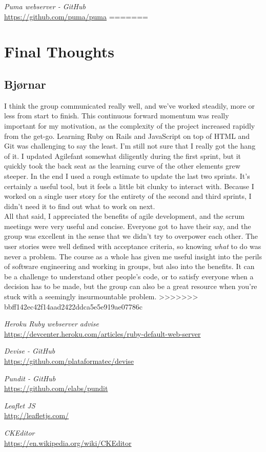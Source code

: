 \documentclass[a4paper]{article}
\begin{document}
\begin{thebibliography}{9}
\emph{Puma webserver - GitHub}\\
\url{https://github.com/puma/puma}
=======
\section{Final Thoughts}

\subsection{Bjørnar}
I think the group communicated really well, and we've worked steadily, more or less from start to finish. This continuous forward momentum was really important for my motivation, as the complexity of the project increased rapidly from the get-go. Learning Ruby on Rails and JavaScript on top of HTML and Git was challenging to say the least. I'm still not sure that I really got the hang of it. I updated Agilefant somewhat diligently during the first sprint, but it quickly took the back seat as the learning curve of the other elements grew steeper. In the end I used a rough estimate to update the last two sprints. It's certainly a useful tool, but it feels a little bit clunky to interact with. Because I worked on a single user story for the entirety of the second and third sprints, I didn't need it to find out what to work on next.\\

\noindent
All that said, I appreciated the benefits of agile development, and the scrum meetings were very useful and concise. Everyone got to have their say, and the group was excellent in the sense that we didn't try to overpower each other. The user stories were well defined with acceptance criteria, so knowing \textit{what} to do was never a problem. The course as a whole has given me useful insight into the perils of software engineering and working in groups, but also into the benefits. It can be a challenge to understand other people's code, or to satisfy everyone when a decision has to be made, but the group can also be a great resource when you're stuck with a seemingly insurmountable problem.
>>>>>>> bbff142ec42f14aad2422ddca5e5e919ae07786c

\emph{Heroku Ruby webserver advise}\\
\url {https://devcenter.heroku.com/articles/ruby-default-web-server}

\emph{Devise - GitHub}\\
\url{https://github.com/plataformatec/devise}


\emph{Pundit - GitHub}\\
\url{https://github.com/elabs/pundit}


\emph{Leaflet JS}\\
\url{http://leafletjs.com/}

\emph{CKEditor}\\
\url{https://en.wikipedia.org/wiki/CKEditor}

\end{thebibliography}
\end{document}
